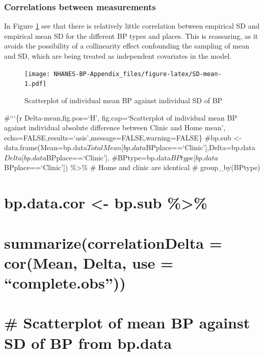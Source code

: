 \documentclass[
]{article}
\begin{document}
\hypertarget{sec:correlations}{%
\subsubsection{Correlations between measurements}\label{sec:correlations}}

In Figure \ref{fig:SD-mean} see that there is relatively little correlation between empirical SD and empirical mean SD for the different BP types and places. This is reassuring, as it avoids the possibility of a collinearity effect confounding the sampling of mean and SD, which are being treated as independent covariates in the model.

\begin{figure}
\centering
\texttt{[image: NHANES-BP-Appendix\_files/figure-latex/SD-mean-1.pdf]}
\caption{\label{fig:SD-mean}Scatterplot of individual mean BP against individual SD of BP}
\end{figure}

\#```\{r Delta-mean,fig.pos=`H', fig.cap=`Scatterplot of individual mean BP against individual absolute difference between Clinic and Home mean', echo=FALSE,results=`asis',message=FALSE,warning=FALSE\}
\#bp.sub \textless- data.frame(Mean=bp.data\(TotalMean[bp.data\)BPplace==`Clinic'{]},Delta=bp.data\(Delta[bp.data\)BPplace==`Clinic'{]}, \#BPtype=bp.data\(BPtype[bp.data\)BPplace==`Clinic'{]}) \%\textgreater\% \# Home and clinic are identical
\# group\_by(BPtype)

\hypertarget{bp.data.cor---bp.sub}{%
\section{bp.data.cor \textless- bp.sub \%\textgreater\%}\label{bp.data.cor---bp.sub}}

\hypertarget{summarizecorrelationdelta-cormean-delta-use-complete.obs}{%
\section{summarize(correlationDelta = cor(Mean, Delta, use = ``complete.obs''))}\label{summarizecorrelationdelta-cormean-delta-use-complete.obs}}

\hypertarget{scatterplot-of-mean-bp-against-sd-of-bp-from-bp.data}{%
\section{\# Scatterplot of mean BP against SD of BP from bp.data}\label{scatterplot-of-mean-bp-against-sd-of-bp-from-bp.data}}
\end{document}

